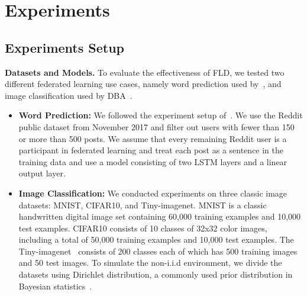 \section{Experiments}
\subsection{Experiments Setup}
\textbf{Datasets and Models.}
To evaluate the effectiveness of FLD, we tested two different federated learning use cases, namely word prediction used by~\cite{howtobackdoor}, and image classification used by DBA~\cite{xie2020dba}.
\begin{itemize}
  \item \textbf{Word Prediction:} We followed the experiment setup of~\cite{howtobackdoor}. We use the Reddit public dataset from November 2017 and filter out users with fewer than 150 or more than 500 posts. We assume that every remaining Reddit user is a participant in federated learning and treat each post as a sentence in the training data and use a model consisting of two LSTM layers and a linear output layer.
  \item \textbf{Image Classification:} We conducted experiments on three classic image datasets: MNIST, CIFAR10, and Tiny-imagenet. MNIST is a classic handwritten digital image set containing 60,000 training examples and 10,000 test examples. CIFAR10 consists of 10 classes of 32x32 color images, including a total of 50,000 training examples and 10,000 test examples. The Tiny-imagenet~\cite{xie2020dba} consists of 200 classes each of which has 500 training images and 50 test images. To simulate the non-i.i.d environment, we divide the datasets using Dirichlet distribution, a commonly used prior distribution in Bayesian statistics~\cite{NONIID}.
\end{itemize}
